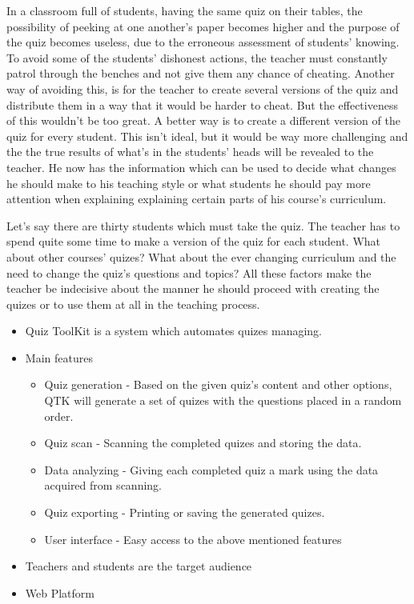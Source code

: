 In a classroom full of students, having the same quiz on their tables, the possibility of peeking at one another’s paper becomes higher and the purpose of the quiz becomes useless, due to the erroneous assessment of students’ knowing. To avoid some of the students’ dishonest actions, the teacher must constantly patrol through the benches and not give them any chance of cheating. Another way of avoiding this, is for the teacher to create several versions of the quiz and distribute them in a way that it would be harder to cheat. But the effectiveness of this wouldn’t be too great. A better way is to create a different version of the quiz for every student. This isn’t ideal, but it would be way more challenging and the the true results of what’s in the students’ heads will be revealed to the teacher. He now has the information which can be used to decide what changes he should make to his teaching style or what students he should pay more attention when explaining  explaining certain parts of his course’s curriculum. 

Let’s say there are thirty students which must take the quiz. The teacher has to spend quite some time to make a version of the quiz for each student. What about other courses’ quizes? What about the ever changing curriculum and the need to change the quiz’s questions and topics? All these factors make the teacher be indecisive about the manner he should proceed with creating the quizes or to use them at all in the teaching process. 

\begin{itemize}
  \item Quiz ToolKit is a system which automates quizes managing.
  \item Main features
  \begin{itemize}
    \item Quiz generation - Based on the given quiz’s content and other options, QTK will generate a set of quizes with the questions placed in a random order.
    \item Quiz scan - Scanning the completed quizes and storing the data.
    \item Data analyzing - Giving each completed quiz a mark using the data acquired from scanning.
    \item Quiz exporting - Printing or saving the generated quizes.
    \item User interface - Easy access to the above mentioned features
  \end{itemize}
  \item Teachers and students are the target audience
  \item Web Platform
\end{itemize}

